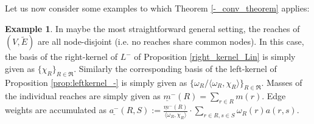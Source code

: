\documentclass[reqno,12pt,letterpaper]{amsart}
\numberwithin{equation}{section}
\newcommand{\1}{\mathds{1}}
\theoremstyle{definition}
\newtheorem{Ex}[Th]{Example}
\begin{document}
Let us now consider some examples to which Theorem \ref{-_conv_theorem} applies:
\begin{Ex}
In maybe the most straightforward general setting, the reaches of $ (V, \tilde{E})$ are all node-disjoint (i.e. no reaches share common nodes). In this case, the basis of  the right-kernel of $L^-$  of Proposition \ref{right_kernel_Lin} is simply given as $\{\chi_R\}_{R \in \mathfrak{R}}$. Similarly the corresponding basis of the left-kernel of Proposition \ref{prop:leftkernel_-} is simply given as $\{\omega_R/\langle\omega_R,\chi_R\rangle\}_{R \in \mathfrak{R}}$. Masses 
 of the individual reaches are simply given as $\underline{m}^-(R) = \sum_{r \in R} m(r)$. Edge weights are accumulated as $
		\underline{a^-}(R, S) := \frac{\underline{m}^-(R)}{\langle \omega_R, \chi_R\rangle}\cdot\sum_{r \in R, s \in S} 
	\omega_R(r)
	a(r,s)
$. 
\end{Ex}
\end{document}
